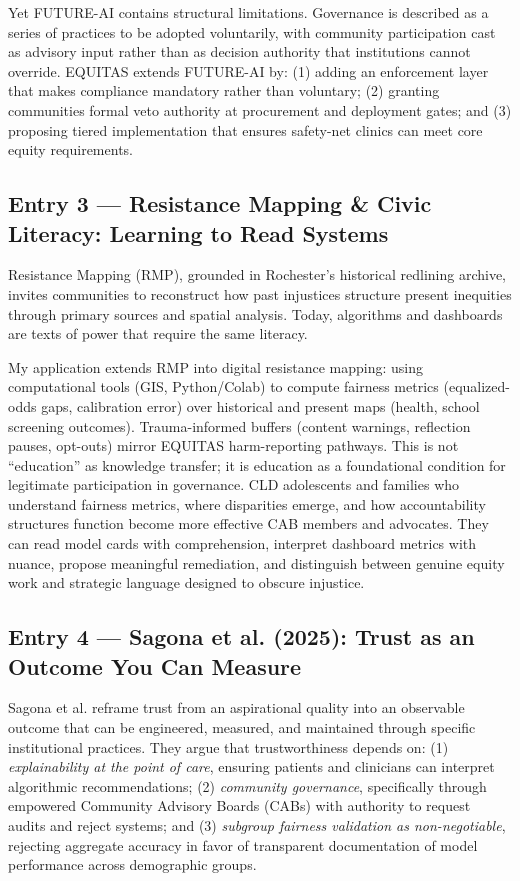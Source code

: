 \documentclass[12pt,a4paper]{article}
\begin{document}
Yet FUTURE-AI contains structural limitations. Governance is described as a series of practices to be adopted voluntarily, with community participation cast as advisory input rather than as decision authority that institutions cannot override.\cite{lekadir2025} EQUITAS extends FUTURE-AI by: (1) adding an enforcement layer that makes compliance mandatory rather than voluntary; (2) granting communities formal veto authority at procurement and deployment gates; and (3) proposing tiered implementation that ensures safety-net clinics can meet core equity requirements.\cite{lekadir2025}

\subsection{Entry 3 — Resistance Mapping \& Civic Literacy: Learning to Read Systems}

Resistance Mapping (RMP), grounded in Rochester's historical redlining archive, invites communities to reconstruct how past injustices structure present inequities through primary sources and spatial analysis. Today, algorithms and dashboards are texts of power that require the same literacy.

My application extends RMP into digital resistance mapping: using computational tools (GIS, Python/Colab) to compute fairness metrics (equalized-odds gaps, calibration error) over historical and present maps (health, school screening outcomes). Trauma-informed buffers (content warnings, reflection pauses, opt-outs) mirror EQUITAS harm-reporting pathways. This is not ``education'' as knowledge transfer; it is education as a foundational condition for legitimate participation in governance. CLD adolescents and families who understand fairness metrics, where disparities emerge, and how accountability structures function become more effective CAB members and advocates. They can read model cards with comprehension, interpret dashboard metrics with nuance, propose meaningful remediation, and distinguish between genuine equity work and strategic language designed to obscure injustice.

\subsection{Entry 4 — Sagona et al. (2025): Trust as an Outcome You Can Measure}

Sagona et al. reframe trust from an aspirational quality into an observable outcome that can be engineered, measured, and maintained through specific institutional practices.\cite{sagona2025} They argue that trustworthiness depends on: (1) \textit{explainability at the point of care}, ensuring patients and clinicians can interpret algorithmic recommendations; (2) \textit{community governance}, specifically through empowered Community Advisory Boards (CABs) with authority to request audits and reject systems; and (3) \textit{subgroup fairness validation as non-negotiable}, rejecting aggregate accuracy in favor of transparent documentation of model performance across demographic groups.\cite{sagona2025}
\end{document}
